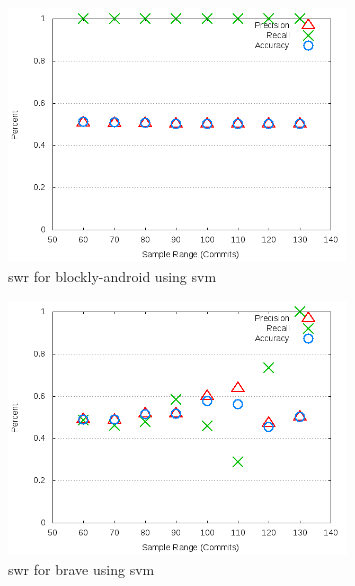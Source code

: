 \clearpage

\begin{figure}[!t]
\centering
\includegraphics[width=0.8\textwidth]{images/svm/test_1/blockly-android_sample_range.png}
\caption{\gls{swr} for blockly-android using \gls{svm}}
\label{fig:test_1_blockly-android_svm}
\end{figure}

\begin{figure}[!t]
\centering
\includegraphics[width=0.8\textwidth]{images/svm/test_1/brave_sample_range.png}
\caption{\gls{swr} for brave using \gls{svm}}
\label{fig:test_1_brave_svm}
\end{figure}

